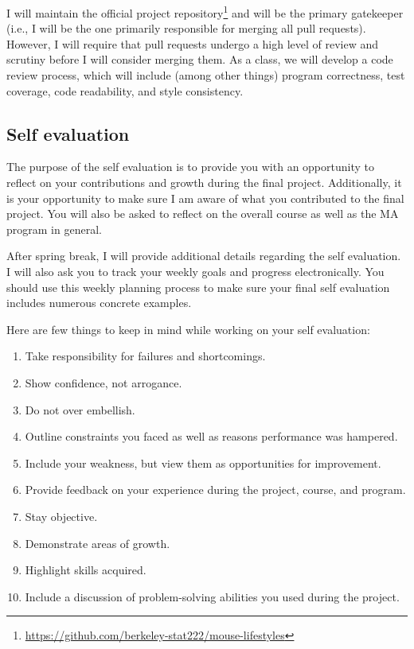 \documentclass[11pt, oneside]{article}   	%
\begin{document}
I will maintain the official project
repository\footnote{\url{https://github.com/berkeley-stat222/mouse-lifestyles}}
and will be the primary gatekeeper (i.e., I will be the one primarily
responsible for merging all pull requests).  However, I will require that pull
requests undergo a high level of review and scrutiny before I will consider
merging them.  As a class, we will develop a code review process, which will
include (among other things) program correctness, test coverage, code
readability, and style consistency.

\subsection{Self evaluation}

The purpose of the self evaluation is to provide you with an opportunity to
reflect on your contributions and growth during the final project.
Additionally, it is your opportunity to make sure I am aware of what you
contributed to the final project.  You will also be asked to reflect on
the overall course as well as the MA program in general.

After spring break, I will provide additional details regarding the self
evaluation.  I will also ask you to track your weekly goals and progress
electronically.  You should use this weekly planning process to make
sure your final self evaluation includes numerous concrete examples.

Here are few things to keep in mind while working on your self evaluation:
\begin{enumerate}
\item Take responsibility for failures and shortcomings.
\item Show confidence, not arrogance.
\item Do not over embellish.
\item Outline constraints you faced as well as reasons performance was hampered.
\item Include your weakness, but view them as opportunities for improvement.
\item Provide feedback on your experience during the project, course, and program.
\item Stay objective.
\item Demonstrate areas of growth.
\item Highlight skills acquired.
\item Include a discussion of problem-solving abilities you used during the project.
\end{enumerate}




\end{document}
